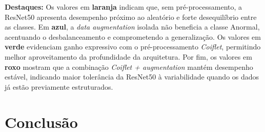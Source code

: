 \begin{table}[!h]
\centering
\caption{Resultados da ResNet50 sob diferentes configurações}
\label{tab:resnet50}
\renewcommand{\arraystretch}{1.2}
\fonteproprioautor
\end{table}


\begin{flushleft}
\footnotesize
\textbf{Destaques:} Os valores em \textbf{laranja} indicam que, sem pré-processamento,
a ResNet50 apresenta desempenho próximo ao aleatório e forte desequilíbrio entre as
classes. Em \textbf{azul}, a \textit{data augmentation} isolada não beneficia a classe Anormal,
acentuando o desbalanceamento e comprometendo a generalização.
Os valores em \textbf{verde} evidenciam ganho expressivo com o pré-processamento
\textit{Coiflet}, permitindo melhor aproveitamento da profundidade da arquitetura.
Por fim, os valores em \textbf{roxo} mostram que a combinação \textit{Coiflet + augmentation}
mantém desempenho estável, indicando maior tolerância da ResNet50 à variabilidade
quando os dados já estão previamente estruturados.
\end{flushleft}

\chapter{Conclusão }\label{Conclusão}


